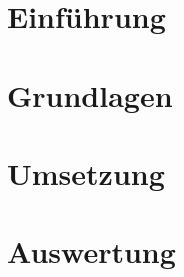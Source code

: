 \documentclass[fontsize=11pt,
		 oneside,
		 ngerman,
		 titlepage,
		 paper=a4,
		 bibliography=totoc,
		 listof=totoc,
		 DIV=10,
		 BCOR=5mm,
		 headsepline,
		 footsepline,
		 ]{scrartcl}
\begin{document}

\cleardoublepage






\tableofcontents
\clearpage

\section{Einführung}
\label{sec:Einführung}



\clearpage

\section{Grundlagen}
\label{sec:Grundlagen}

\clearpage

\clearpage

\clearpage

\clearpage

\section{Umsetzung}
\label{sec:Umsetzung}

\clearpage

\clearpage

\clearpage

\clearpage

\section{Auswertung}
\label{sec:Auswertung}

\clearpage




\listoffigures
\clearpage
\lstlistoflistings
\clearpage
%

\renewcommand{\refname}{Quellenverzeichnis}



\clearpage





\mbox{}
\end{document}
